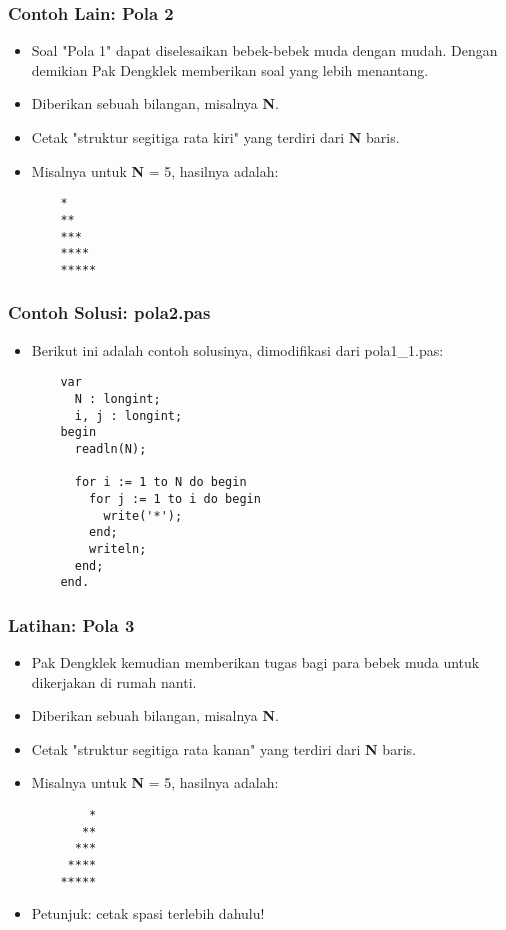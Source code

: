\documentclass{beamer}
\begin{document}
\begin{frame}[fragile]
\frametitle{Contoh Lain: Pola 2}
\begin{itemize}
  \item Soal "Pola 1" dapat diselesaikan bebek-bebek muda dengan mudah. Dengan demikian Pak Dengklek memberikan soal yang lebih menantang.
  \item Diberikan sebuah bilangan, misalnya \textbf{N}.
  \item Cetak "struktur segitiga rata kiri" yang terdiri dari \textbf{N} baris.
  \item Misalnya untuk \textbf{N} = 5, hasilnya adalah:
  \begin{lstlisting}
    *
    **
    ***
    ****
    *****
  \end{lstlisting}
\end{itemize}
\end{frame}

\begin{frame}[fragile]
\frametitle{Contoh Solusi: pola2.pas}
\begin{itemize}
  \item Berikut ini adalah contoh solusinya, dimodifikasi dari pola1\_1.pas:
  \begin{lstlisting}
    var
      N : longint;
      i, j : longint;
    begin
      readln(N);

      for i := 1 to N do begin
        for j := 1 to i do begin
          write('*');
        end;
        writeln;
      end;
    end.
  \end{lstlisting}
\end{itemize}
\end{frame}

\begin{frame}[fragile]
\frametitle{Latihan: Pola 3}
\begin{itemize}
  \item Pak Dengklek kemudian memberikan tugas bagi para bebek muda untuk dikerjakan di rumah nanti.
  \item Diberikan sebuah bilangan, misalnya \textbf{N}.
  \item Cetak "struktur segitiga rata kanan" yang terdiri dari \textbf{N} baris.
  \item Misalnya untuk \textbf{N} = 5, hasilnya adalah:
  \begin{lstlisting}
        *
       **
      ***
     ****
    *****
  \end{lstlisting}
  \item Petunjuk: cetak spasi terlebih dahulu!
\end{itemize}
\end{frame}
\end{document}
